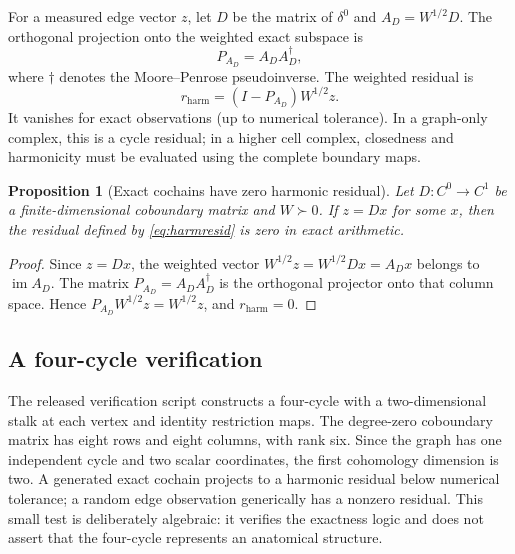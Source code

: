 \documentclass[12pt,a4paper]{article}
\newtheorem{proposition}[definition]{Proposition}
\DeclareMathOperator{\im}{im}
\begin{document}
For a measured edge vector \(z\), let \(D\) be the matrix of \(\delta^0\) and \(A_D=W^{1/2}D\). The orthogonal projection onto the weighted exact subspace is
\[
P_{A_D}=A_DA_D^{\dagger},
\tag{9}\label{eq:projection}
\]
where \(\dagger\) denotes the Moore--Penrose pseudoinverse. The weighted residual is
\[
r_{\mathrm{harm}}=(I-P_{A_D})W^{1/2}z.
\tag{10}\label{eq:harmresid}
\]
It vanishes for exact observations (up to numerical tolerance). In a graph-only complex, this is a cycle residual; in a higher cell complex, closedness and harmonicity must be evaluated using the complete boundary maps.

\begin{proposition}[Exact cochains have zero harmonic residual]
Let \(D:C^0\to C^1\) be a finite-dimensional coboundary matrix and \(W\succ0\). If \(z=Dx\) for some \(x\), then the residual defined by \eqref{eq:harmresid} is zero in exact arithmetic.
\end{proposition}
\begin{proof}
Since \(z=Dx\), the weighted vector \(W^{1/2}z=W^{1/2}Dx=A_Dx\) belongs to \(\im A_D\). The matrix \(P_{A_D}=A_DA_D^\dagger\) is the orthogonal projector onto that column space. Hence \(P_{A_D}W^{1/2}z=W^{1/2}z\), and \(r_{\mathrm{harm}}=0\).\end{proof}

\subsection{A four-cycle verification}
The released verification script constructs a four-cycle with a two-dimensional stalk at each vertex and identity restriction maps. The degree-zero coboundary matrix has eight rows and eight columns, with rank six. Since the graph has one independent cycle and two scalar coordinates, the first cohomology dimension is two. A generated exact cochain projects to a harmonic residual below numerical tolerance; a random edge observation generically has a nonzero residual. This small test is deliberately algebraic: it verifies the exactness logic and does not assert that the four-cycle represents an anatomical structure.
\end{document}
